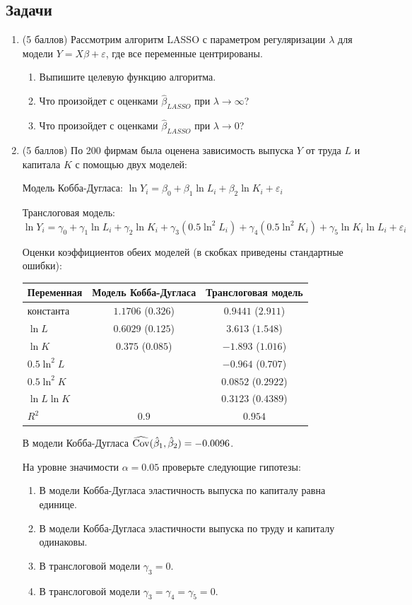 \subsection*{Задачи}
\begin{enumerate}
\item
(5 баллов)
Рассмотрим алгоритм LASSO с параметром регуляризации $\lambda$
для модели $Y=X\beta + \varepsilon$, где все переменные центрированы.
\begin{enumerate}
    \item Выпишите целевую функцию алгоритма.
    \item Что произойдет с оценками $\hat\beta_{LASSO}$ при $\lambda \to \infty$?
    \item Что произойдет с оценками $\hat\beta_{LASSO}$ при $\lambda \to 0$?
\end{enumerate}
\item
(5 баллов)
По 200 фирмам была оценена зависимость выпуска $Y$ от труда $L$ и капитала $K$
с помощью двух моделей:

Модель Кобба-Дугласа: $\ln{Y_i} = \beta_0 + \beta_1 \ln{L_i} + \beta_2 \ln{K_i} +
\varepsilon_i$

Транслоговая модель: $\ln{Y_i} = \gamma_0 + \gamma_1 \ln{L_i} + \gamma_2 \ln{K_i} +
\gamma_3 (0.5 \ln^2{L_i}) + \gamma_4 (0.5 \ln^2{K_i}) + \gamma_5 \ln{K_i} \ln{L_i} +
\varepsilon_i$

Оценки коэффициентов обеих моделей (в скобках приведены стандартные ошибки):

\begin{tabular}{lcc}
\toprule
Переменная & Модель Кобба-Дугласа & Транслоговая модель \\
\midrule
константа & $1.1706$ ($0.326$) & $0.9441$ ($2.911$)   \\
$\ln L$ & $0.6029$ ($0.125$) & $3.613$ ($1.548$)  \\
$\ln K$ & $0.375$ ($0.085$) & $-1.893$ ($1.016$)  \\
$0.5 \ln^2 L$ &  & $-0.964$ ($0.707$)  \\
$0.5 \ln^2 K$ & & $0.0852$ ($0.2922$) \\
$\ln L \ln K$ & & $0.3123$ ($0.4389$)  \\
$R^2$ & $0.9$ & $0.954$  \\
\bottomrule
\end{tabular}

В модели Кобба-Дугласа $\widehat{\operatorname{Cov}}(\hat{\beta}_1, \hat{\beta}_2)= -0.0096$.

На уровне значимости $\alpha = 0.05$ проверьте следующие гипотезы:
\begin{enumerate}
\item В модели Кобба-Дугласа эластичность выпуска по капиталу равна единице.
\item В модели Кобба-Дугласа эластичности выпуска по труду и капиталу одинаковы.
\item В транслоговой модели $\gamma_3 = 0$.
\item В транслоговой модели $\gamma_3 = \gamma_4 = \gamma_5 = 0$.
\end{enumerate}


\end{enumerate}
